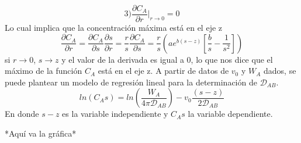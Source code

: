  \begin{equation*}
     3) \frac{\partial C_A}{\partial r}|_{r\rightarrow0}=0
 \end{equation*}
 Lo cual implica que la concentración máxima está en el eje z
 \begin{equation*}
    \frac{\partial C_A}{\partial r}=\frac{\partial C_A}{\partial s}\frac{\partial s}{\partial r}=\frac{r}{s}\frac{\partial C_A}{\partial s}=\frac{r}{s}(ae^{b(s-z)}[\frac{b}{s}-\frac{1}{s^2}])
 \end{equation*}
 si $r\rightarrow0$, $s\rightarrow z$ y el valor de la derivada es igual a 0, lo que nos dice que el máximo de la función $C_A$ está en el eje z.
 A partir de datos de $v_0$ y $W_A$ dados, se puede plantear un modelo de regresión lineal para la determinación de $\mathscr{D}_{AB}$.
 \begin{equation*}
     ln(C_As)=ln(\frac{W_A}{4\pi \mathscr{D}_{AB}})-v_0\frac{(s-z)}{2\mathscr{D}_{AB}}
 \end{equation*}
 En donde $s-z$ es la variable independiente y $C_As$ la variable dependiente.

 *Aquí va la gráfica* %
 
